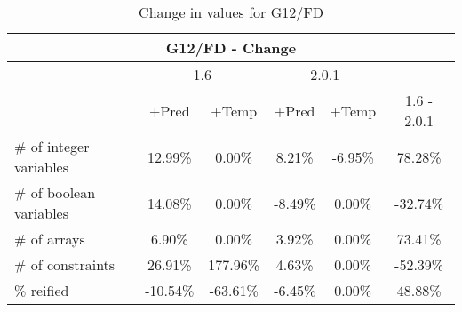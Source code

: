 \documentclass{standalone}
\begin{document}
\begin{table}[H]
\footnotesize
\centering
\begin{tabular}{lc|c|c|c|c}
\multicolumn{6}{c}{G12/FD - Change} \\ 
\hline\hline  & \multicolumn{2}{c|}{1.6} &\multicolumn{2}{c|}{2.0.1} &\\ 
\hline  & +Pred & +Temp & +Pred & +Temp & 1.6 - 2.0.1\\
\# of integer variables & 12.99\% & 0.00\% & 8.21\% & -6.95\% & 78.28\% \\ 
\# of boolean variables & 14.08\% & 0.00\% & -8.49\% & 0.00\% & -32.74\% \\
\# of arrays            & 6.90\% & 0.00\% & 3.92\% & 0.00\% & 73.41\% \\
\# of constraints       & 26.91\% & 177.96\% & 4.63\% & 0.00\% & -52.39\% \\ 
\% reified               & -10.54\% & -63.61\% & -6.45\% & 0.00\% & 48.88\%\\ 
\end{tabular}\caption{Change in values for G12/FD}
\end{table}
\end{document}
